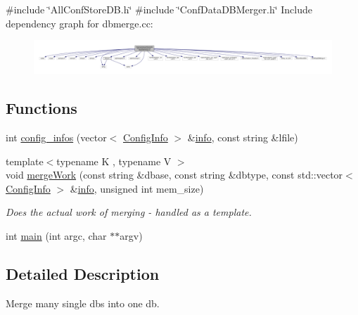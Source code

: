 {\ttfamily \#include \char`\"{}All\+Conf\+Store\+D\+B.\+h\char`\"{}}\newline
{\ttfamily \#include \char`\"{}Conf\+Data\+D\+B\+Merger.\+h\char`\"{}}\newline
Include dependency graph for dbmerge.\+cc\+:
\nopagebreak
\begin{figure}[H]
\begin{center}
\leavevmode
\includegraphics[width=350pt]{dc/dd6/adat-devel_2main_2dbutil_2dbmerge_8cc__incl}
\end{center}
\end{figure}
\subsection*{Functions}
\begin{DoxyCompactItemize}
\item 
int \mbox{\hyperlink{adat-devel_2main_2dbutil_2dbmerge_8cc_aaa3cdbe7635762272a40e8dc7887778c}{config\+\_\+infos}} (vector$<$ \mbox{\hyperlink{classFILEDB_1_1ConfigInfo}{Config\+Info}} $>$ \&\mbox{\hyperlink{structinfo}{info}}, const string \&lfile)
\item 
{\footnotesize template$<$typename K , typename V $>$ }\\void \mbox{\hyperlink{adat-devel_2main_2dbutil_2dbmerge_8cc_a6c8a139a4e0f3c2eb65b1a9828dc910a}{merge\+Work}} (const string \&dbase, const string \&dbtype, const std\+::vector$<$ \mbox{\hyperlink{classFILEDB_1_1ConfigInfo}{Config\+Info}} $>$ \&\mbox{\hyperlink{structinfo}{info}}, unsigned int mem\+\_\+size)
\begin{DoxyCompactList}\small\item\em Does the actual work of merging -\/ handled as a template. \end{DoxyCompactList}\item 
int \mbox{\hyperlink{adat-devel_2main_2dbutil_2dbmerge_8cc_a3c04138a5bfe5d72780bb7e82a18e627}{main}} (int argc, char $\ast$$\ast$argv)
\end{DoxyCompactItemize}


\subsection{Detailed Description}
Merge many single dbs into one db. 



